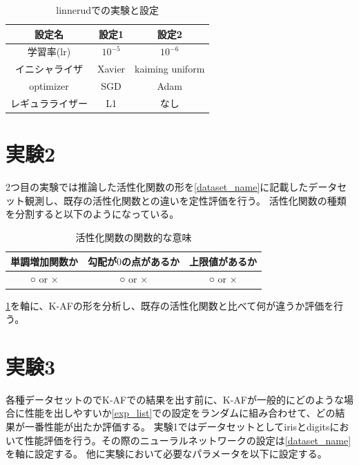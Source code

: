 \begin{table}[htbp]
    \begin{center}
        \caption{linnerudでの実験と設定}
        \vspace{5mm} 
        \begin{tabular}{ |c|c|c| }
        設定名 & 設定1 & 設定2 \\
        \hline
        学習率(lr)         & $ 10^{-5} $ & $ 10^{-6} $ \\
        イニシャライザ       & Xavier & kaiming uniform \\
        optimizer           & SGD & Adam \\
        レギュラライザー     & L1 & なし \\
        \end{tabular}
    \end{center}
\end{table}



\section{実験2}
\label{exp2}

2つ目の実験では推論した活性化関数の形を\ref{dataset_name}に記載したデータセット観測し、既存の活性化関数との違いを定性評価を行う。
活性化関数の種類を分割すると以下のようになっている。

\begin{table}[htbp]
    \begin{center}
        \caption{活性化関数の関数的な意味}
        \label{af-class}
        \vspace{5mm} 
        \begin{tabular}{ |c|c|c| }
        単調増加関数か & 勾配が$ 0 $の点があるか & 上限値があるか   \\
        \hline
        ○ or × & ○ or × & ○ or ×  \\
        \end{tabular}
    \end{center}
\end{table}

\ref{af-class}を軸に、K-AFの形を分析し、既存の活性化関数と比べて何が違うか評価を行う。






\section{実験3}
\label{exp3}
各種データセットのでK-AFでの結果を出す前に、K-AFが一般的にどのような場合に性能を出しやすいか\ref{exp_list}での設定をランダムに組み合わせて、どの結果が一番性能が出たか評価する。
実験1ではデータセットとしてirisとdigitsにおいて性能評価を行う。その際のニューラルネットワークの設定は\ref{dataset_name}を軸に設定する。
他に実験において必要なパラメータを以下に設定する。



